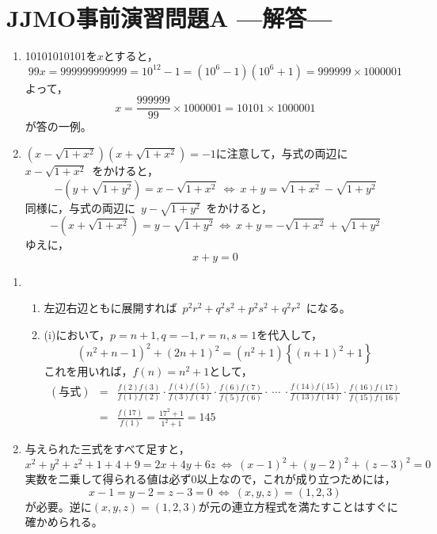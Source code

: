 \documentclass[a4paper,12pt]{jsarticle}
\begin{document}
\newpage

\section*{JJMO事前演習問題A ---解答---} %


\begin{enumerate}
\item 
10101010101を$x$とすると，
  $$ 99x = 999999999999 = 10^{12}-1 = (10^{6}-1)(10^{6}+1) = 999999 \times 1000001$$
よって，
  $$ x= \frac{999999}{99} \times 1000001 = 10101 \times 1000001$$
が答の一例。
\item 
$(x-\sqrt{1+x^{2}})(x+\sqrt{1+x^2}) = -1$に注意して，与式の両辺に\ $x-\sqrt{1+x^{2}}$\ をかけると，
$$ -(y+\sqrt{1+y^{2}}) = x-\sqrt{1+x^{2}} \ \Leftrightarrow \ x+y = \sqrt{1+x^{2}} - \sqrt{1+y^{2}} $$
同様に，与式の両辺に\ $y-\sqrt{1+y^{2}}$\ をかけると，
$$ -(x+\sqrt{1+x^{2}}) = y-\sqrt{1+y^{2}} \ \Leftrightarrow \ x+y = -\sqrt{1+x^{2}} + \sqrt{1+y^{2}} $$
ゆえに，
$$ x+y = 0 $$
\end{enumerate}

\bigskip


\begin{enumerate}
\item 
  \begin{enumerate}
  \item 
  左辺右辺ともに展開すれば\ $p^{2}r^{2} + q^{2}s^{2} + p^{2}s^{2} + q^{2}r^{2}$\ になる。
  \item (i)において，$p = n+1 ,q = -1 ,r = n ,s = 1$を代入して，
  $$ (n^{2} + n -1)^{2} + (2n + 1)^{2} = (n^{2} + 1) \left\{( n + 1 )^{2} + 1 \right\} $$
  これを用いれば，$f(n) = n^{2} + 1$として，
  \begin{eqnarray} (与式) & = & \frac{f(2)f(3)}{f(1)f(2)} \cdot \frac{f(4)f(5)}{f(3)f(4)} \cdot \frac{f(6)f(7)}{f(5)f(6)} \cdot \ \cdots \ \cdot \frac{f(14)f(15)}{f(13)f(14)} \cdot \frac{f(16)f(17)}{f(15)f(16)} \nonumber \\
  & = & \frac{f(17)}{f(1)} = \frac{17^{2}+1}{1^{2}+1} = 145 \nonumber
  \end{eqnarray}

  \end{enumerate}

\item
与えられた三式をすべて足すと，
  $$ x^{2}+y^{2}+z^{2}+1+4+9 = 2x + 4y + 6z \ \Leftrightarrow \ (x-1)^{2} + (y-2)^{2} + (z-3)^{2} = 0 $$
実数を二乗して得られる値は必ず0以上なので，これが成り立つためには，
  $$ x-1 = y-2 = z-3 =0 \ \Leftrightarrow\ (x,y,z) = (1,2,3)$$
が必要。逆に$(x,y,z) = (1,2,3)$が元の連立方程式を満たすことはすぐに確かめられる。


\end{enumerate}
\end{document}

